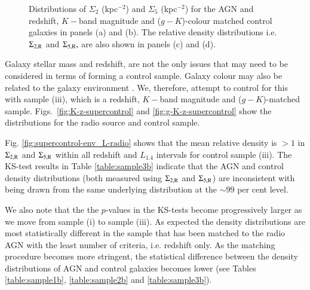 \begin{figure}
  \caption[Sample (iii): $\Sigma_2$ and $\Sigma_5$ histograms; $\Sigma_{2,\rm{R}}$ and $\Sigma_{5,\rm{R}}$ histograms]{Distributions of $\Sigma_2$ (kpc$^{-2}$) and $\Sigma_5$ (kpc$^{-2}$) for the AGN and redshift, $K-$band magnitude and ($g-K$)-colour matched control galaxies in panels (a) and (b). The relative density distributions i.e. $\Sigma_{2,\rm{R}}$ and $\Sigma_{5,\rm{R}},$ are also shown in panels (c) and (d).}
  \label{fig:supercontrol-env_L_radio_hist}
\end{figure}

Galaxy stellar mass and redshift, are not the only issues that may need to be considered in terms of forming a control sample. Galaxy colour may also be related to the galaxy environment \citep[e.g.][]{Madgwick2003,Zehavi2011,Wang2018}. We, therefore, attempt to control for this with sample (iii), which is a redshift, $K-$band magnitude and ($g-K$)-matched sample. Figs.~\ref{fig:K-z-supercontrol} and \ref{fig:g-K-z-supercontrol} show the distributions for the radio source and control sample. 

Fig. \ref{fig:supercontrol-env_L-radio} shows that the mean relative density is $>1$ in $\Sigma_{2,\rm{R}}$ and $\Sigma_{5,\rm{R}}$ within all redshift and $L_{1.4}$ intervals for control sample (iii). The KS-test results in Table \ref{table:sample3b} indicate that the AGN and control density distributions (both measured using $\Sigma_{2,\rm{R}}$ and $\Sigma_{5,\rm{R}}$) are inconsistent with being drawn from the same underlying distribution at the $\sim 99$ per cent level.

We also note that the the $p$-values in the KS-tests become progressively larger as we move from sample (i) to sample (iii). As expected the density distributions are most statistically different in the sample that has been matched to the radio AGN with the least number of criteria, i.e. redshift only. As the matching procedure becomes more stringent, the statistical difference between the density distributions of AGN and control galaxies becomes lower (see Tables \ref{table:sample1b}, \ref{table:sample2b} and \ref{table:sample3b}).

